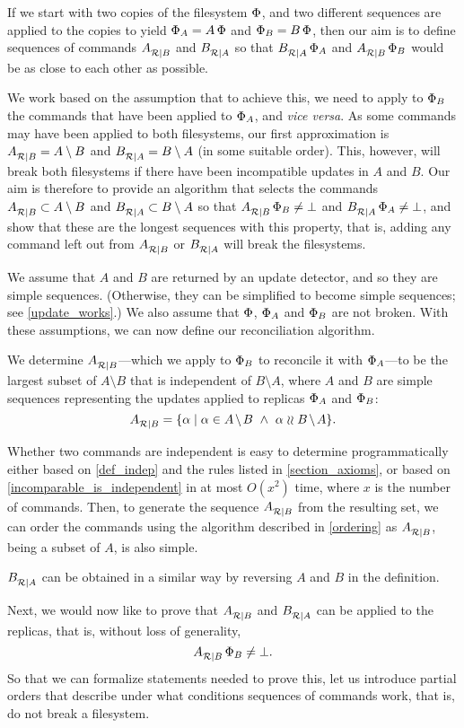 
If we start with two copies of the filesystem $\Phi$,
and two different sequences are applied to the copies to yield $\Phi_A=A\,\Phi$
and $\Phi_B=B\,\Phi$, then our aim is to define sequences of commands ${A}^{}_{\mathcal{R}|{B}}$ and ${B}^{}_{\mathcal{R}|{A}}$
so that ${B}^{}_{\mathcal{R}|{A}}\,\Phi_A$ and ${A}^{}_{\mathcal{R}|{B}}\,\Phi_B$ would be as close to each other as possible.

We work based on the assumption that to achieve this, we need
to apply to $\Phi_B$ the commands that have been applied to $\Phi_A$, and \emph{vice versa}.
As some commands may have been applied to both filesystems, our first approximation
is ${A}^{}_{\mathcal{R}|{B}} = A\setminus B$ and ${B}^{}_{\mathcal{R}|{A}} = B\setminus A$
(in some suitable order).
This, however, will break both filesystems if there have been incompatible updates
in $A$ and $B$. 
Our aim is therefore to provide an algorithm that selects the commands 
${A}^{}_{\mathcal{R}|{B}} \subset A\setminus B$
and ${B}^{}_{\mathcal{R}|{A}} \subset B\setminus A$ 
so that ${A}^{}_{\mathcal{R}|{B}}\,\Phi_B\neq\bot$ and ${B}^{}_{\mathcal{R}|{A}}\,\Phi_A\neq\bot$,
and show that these are the longest sequences with this property, that is,
adding any command left out from ${A}^{}_{\mathcal{R}|{B}}$ or ${B}^{}_{\mathcal{R}|{A}}$ will break the filesystems.

We assume that $A$ and $B$ are returned by an update detector,
and so they are simple sequences.
(Otherwise, they can be simplified to become simple sequences; see \cref{update_works}.)
We also assume that $\Phi$, $\Phi_A$ and $\Phi_B$ are not broken.
With these assumptions,
we can now define our reconciliation algorithm.

\begin{mydef}[Reconciliation]\label{def:reconciliation}
We determine ${A}^{}_{\mathcal{R}|{B}}$---which we apply to $\Phi_B$ 
to reconcile it with $\Phi_A$---to be
the largest subset of $A\setminus B$
that is independent of $B\setminus A$,
where $A$ and $B$ are simple sequences representing
the updates applied to replicas $\Phi_A$ and $\Phi_B$:
\[ \reca = \{\alpha \whr \alpha\in \ambnp  \ \wedge\   \alpha\indep \bmanp \}. \]
\end{mydef}

Whether two commands are independent is easy to determine programmatically
either based on \cref{def_indep} and the rules listed in \cref{section_axioms},
or based on \cref{incomparable_is_independent} 
in at most $O(x^2)$ time, where $x$ is the number of commands.
Then, to generate the sequence ${A}^{}_{\mathcal{R}|{B}}$ from the resulting set, 
we can order the commands using the algorithm described in
\cref{ordering} as ${A}^{}_{\mathcal{R}|{B}}$, being a subset of $A$, is also simple.

${B}^{}_{\mathcal{R}|{A}}$ can be obtained in a similar way by reversing $A$ and $B$
in the definition.

\bigskip

\noindent
Next, we would now like to prove that ${A}^{}_{\mathcal{R}|{B}}$ and ${B}^{}_{\mathcal{R}|{A}}$ can be applied to the replicas,
that is, without loss of generality,
\[ {A}^{}_{\mathcal{R}|{B}}\,\Phi_B\neq\bot. \]
So that we can formalize statements needed to prove this,
let us introduce partial orders that describe under what conditions
sequences of commands work, that is, do not break a filesystem.

